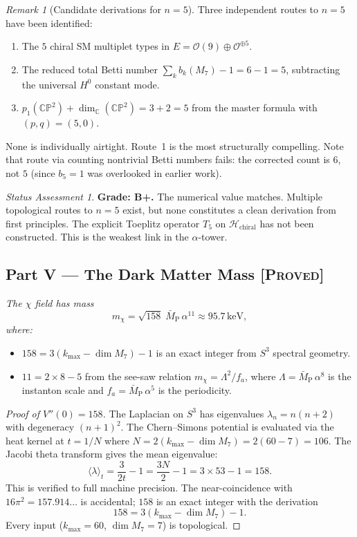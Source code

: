 \documentclass[11pt]{article}
\theoremstyle{definition}
\theoremstyle{remark}
\newtheorem*{remark}{Remark}
\newtheorem*{status}{Status Assessment}
\newcommand{\CP}{\mathbb{CP}}
\newcommand{\MPbar}{\bar{M}_{\mathrm{P}}}
\newcommand{\keV}{\,\mathrm{keV}}
\begin{document}
\begin{remark}[Candidate derivations for $n = 5$]
Three independent routes to $n = 5$ have been identified:
\begin{enumerate}
\item The $5$ chiral SM multiplet types in $E = \mathcal{O}(9) \oplus
  \mathcal{O}^{\oplus 5}$.
\item The reduced total Betti number
  $\sum_k b_k(M_7) - 1 = 6 - 1 = 5$, subtracting the universal $H^0$
  constant mode.
\item $p_1(\CP^2) + \dim_{\mathbb{C}}(\CP^2) = 3 + 2 = 5$ from
  the master formula with $(p,q) = (5,0)$.
\end{enumerate}
None is individually airtight.  Route~1 is the most structurally
compelling.  Note that route via counting nontrivial Betti numbers
fails: the corrected count is $6$, not $5$ (since $b_5 = 1$ was
overlooked in earlier work).
\end{remark}

\begin{status}
\textbf{Grade: B+.}  The numerical value matches.  Multiple
topological routes to $n = 5$ exist, but none constitutes a clean
derivation from first principles.  The explicit Toeplitz operator
$T_5$ on $\mathcal{H}_{\mathrm{chiral}}$ has not been constructed.
This is the weakest link in the $\alpha$-tower.
\end{status}


\subsection*{Part V --- The Dark Matter Mass%
\hfill\normalfont\textsc{[Proved]}}

\textit{The $\chi$ field has mass}
\begin{equation}\label{eq:mchi}
  m_\chi = \sqrt{158}\;\MPbar\,\alpha^{11} \approx 95.7\keV,
\end{equation}
\textit{where:}
\begin{itemize}
\item $158 = 3(k_{\max} - \dim M_7) - 1$ is an exact integer from
  $S^3$ spectral geometry.
\item $11 = 2 \times 8 - 5$ from the see-saw relation
  $m_\chi = \Lambda^2/f_a$, where $\Lambda = \MPbar\,\alpha^{8}$
  is the instanton scale and $f_a = \MPbar\,\alpha^{5}$ is the
  periodicity.
\end{itemize}

\begin{proof}[Proof of $V''(0) = 158$]
The Laplacian on $S^3$ has eigenvalues $\lambda_n = n(n+2)$ with
degeneracy $(n+1)^2$.  The Chern--Simons potential is evaluated via the
heat kernel at $t = 1/N$ where $N = 2(k_{\max} - \dim M_7)
= 2(60 - 7) = 106$.  The Jacobi theta transform gives the mean
eigenvalue:
\[
  \langle\lambda\rangle_t = \frac{3}{2t} - 1
  = \frac{3N}{2} - 1 = 3 \times 53 - 1 = 158.
\]
This is verified to full machine precision.  The near-coincidence
with $16\pi^2 = 157.914\ldots$ is accidental; $158$ is an exact
integer with the derivation
\[
  158 = 3(k_{\max} - \dim M_7) - 1.
\]
Every input ($k_{\max} = 60$, $\dim M_7 = 7$) is topological.
\end{proof}
\end{document}
